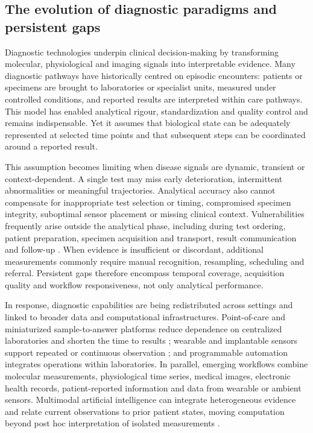\documentclass[12pt,a4paper]{article}
\begin{document}
\subsection{The evolution of diagnostic paradigms and persistent gaps}
\label{subsec:evolution_medical_detection}

Diagnostic technologies underpin clinical decision-making by transforming molecular, physiological and imaging signals into interpretable evidence. Many diagnostic pathways have historically centred on episodic encounters: patients or specimens are brought to laboratories or specialist units, measured under controlled conditions, and reported results are interpreted within care pathways. This model has enabled analytical rigour, standardization and quality control and remains indispensable. Yet it assumes that biological state can be adequately represented at selected time points and that subsequent steps can be coordinated around a reported result.

This assumption becomes limiting when disease signals are dynamic, transient or context-dependent. A single test may miss early deterioration, intermittent abnormalities or meaningful trajectories. Analytical accuracy also cannot compensate for inappropriate test selection or timing, compromised specimen integrity, suboptimal sensor placement or missing clinical context. Vulnerabilities frequently arise outside the analytical phase, including during test ordering, patient preparation, specimen acquisition and transport, result communication and follow-up \cite{Plebani2010DetectionPrevention}. When evidence is insufficient or discordant, additional measurements commonly require manual recognition, resampling, scheduling and referral. Persistent gaps therefore encompass temporal coverage, acquisition quality and workflow responsiveness, not only analytical performance.

In response, diagnostic capabilities are being redistributed across settings and linked to broader data and computational infrastructures. Point-of-care and miniaturized sample-to-answer platforms reduce dependence on centralized laboratories and shorten the time to results \cite{Han2025MLPointOfCare}; wearable and implantable sensors support repeated or continuous observation \cite{Ates2022EndToEndWearables}; and programmable automation integrates operations within laboratories. In parallel, emerging workflows combine molecular measurements, physiological time series, medical images, electronic health records, patient-reported information and data from wearable or ambient sensors. Multimodal artificial intelligence can integrate heterogeneous evidence and relate current observations to prior patient states, moving computation beyond post hoc interpretation of isolated measurements \cite{Acosta2022MultimodalBiomedicalAI}.
\end{document}
